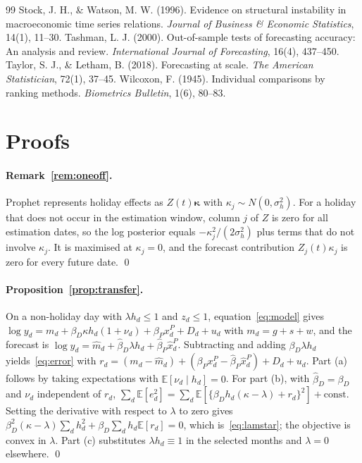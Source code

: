 \documentclass{article}
\theoremstyle{plain}
\theoremstyle{definition}
\theoremstyle{remark}
\newcommand{\E}{\mathbb{E}}
\begin{document}
\begin{thebibliography}{99}
 Stock, J. H., \& Watson, M. W. (1996). Evidence on structural instability in macroeconomic time series relations. \emph{Journal of Business \& Economic Statistics}, 14(1), 11--30.
 Tashman, L. J. (2000). Out-of-sample tests of forecasting accuracy: An analysis and review. \emph{International Journal of Forecasting}, 16(4), 437--450.
 Taylor, S. J., \& Letham, B. (2018). Forecasting at scale. \emph{The American Statistician}, 72(1), 37--45.
 Wilcoxon, F. (1945). Individual comparisons by ranking methods. \emph{Biometrics Bulletin}, 1(6), 80--83.
\end{thebibliography}

\appendix
\section{Proofs}\label{app:proofs}
\paragraph{Remark~\ref{rem:oneoff}.} Prophet represents holiday effects as $Z(t)\bm{\kappa}$ with $\kappa_j\sim N(0,\sigma_h^2)$. For a holiday that does not occur in the estimation window, column $j$ of $Z$ is zero for all estimation dates, so the log posterior equals $-\kappa_j^2/(2\sigma_h^2)$ plus terms that do not involve $\kappa_j$. It is maximised at $\kappa_j=0$, and the forecast contribution $Z_j(t)\kappa_j$ is zero for every future date. \qed

\paragraph{Proposition~\ref{prop:transfer}.} On a non-holiday day with $\lambda h_d\le1$ and $z_d\le1$, equation~\eqref{eq:model} gives $\log y_d=m_d+\beta_D\kappa h_d(1+\nu_d)+\beta_P x^P_d+D_d+u_d$ with $m_d=g+s+w$, and the forecast is $\log\hat y_d=\hat m_d+\hat\beta_D\lambda h_d+\hat\beta_P\hat x^P_d$. Subtracting and adding $\beta_D\lambda h_d$ yields~\eqref{eq:error} with $r_d=(m_d-\hat m_d)+(\beta_P x^P_d-\hat\beta_P\hat x^P_d)+D_d+u_d$. Part (a) follows by taking expectations with $\E[\nu_d\mid h_d]=0$. For part (b), with $\hat\beta_D=\beta_D$ and $\nu_d$ independent of $r_d$, $\sum_d\E[e_d^2]=\sum_d\E[\{\beta_D h_d(\kappa-\lambda)+r_d\}^2]+\text{const}$. Setting the derivative with respect to $\lambda$ to zero gives $\beta_D^2(\kappa-\lambda)\sum_d h_d^2+\beta_D\sum_d h_d\E[r_d]=0$, which is~\eqref{eq:lamstar}; the objective is convex in $\lambda$. Part (c) substitutes $\lambda h_d\equiv1$ in the selected months and $\lambda=0$ elsewhere. \qed
\end{document}
